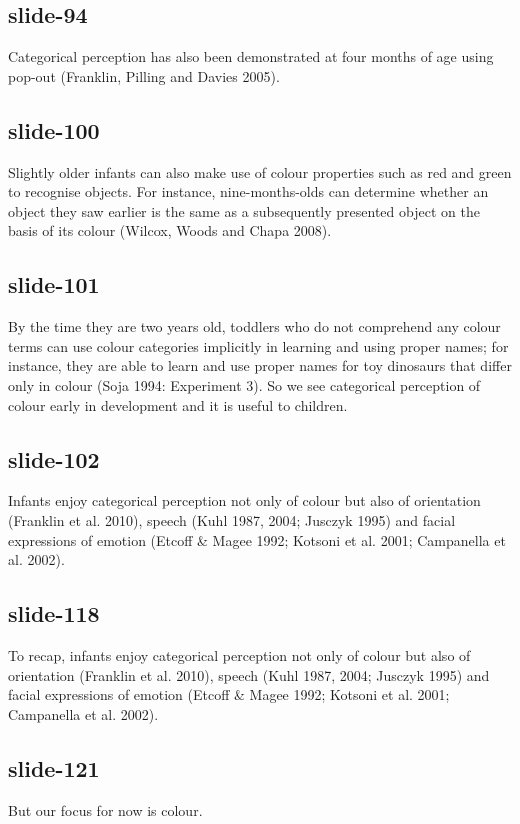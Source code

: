 \documentclass[12pt,\papersize]{extarticle}
\begin{document}
 
\subsection{slide-94}
Categorical perception has also been demonstrated at four months of age using pop-out (Franklin, Pilling and Davies 2005).
 
 
\subsection{slide-100}
Slightly older infants can also make use of colour properties such as red and green to recognise objects. For instance, nine-months-olds can determine whether an object they saw earlier is the same as a subsequently presented object on the basis of its colour (Wilcox, Woods and Chapa 2008).
 
 
\subsection{slide-101}
By the time they are two years old, toddlers who do not comprehend any colour terms can use colour categories implicitly in learning and using proper names; for instance, they are able to learn and use proper names for toy dinosaurs that differ only in colour (Soja 1994: Experiment 3).
So we see categorical perception of colour early in development and it is useful to children.
 
 
\subsection{slide-102}
Infants enjoy categorical perception not only of colour but also of orientation (Franklin et al. 2010), speech (Kuhl 1987, 2004; Jusczyk 1995) and facial expressions of emotion (Etcoff \& Magee 1992; Kotsoni et al. 2001; Campanella et al. 2002).
 
 
\subsection{slide-118}
To recap, infants enjoy categorical perception not only of colour but also of orientation (Franklin et al. 2010), speech (Kuhl 1987, 2004; Jusczyk 1995) and facial expressions of emotion (Etcoff \& Magee 1992; Kotsoni et al. 2001; Campanella et al. 2002).
 
 
\subsection{slide-121}
But our focus for now is colour.
 
\end{document}
